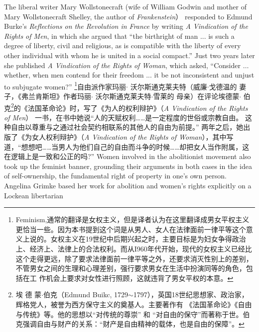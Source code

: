 \begin{paracol}{2}
The liberal writer Mary Wollstonecraft (wife of William Godwin and mother of Mary Wollstonecraft Shelley, the author of \textit{Frankenstein}） responded to Edmund Burke's \textit{Reflections on the
Revolution in France} by writing \textit{A Vindication of the Rights of Men},
in which she argued that ``the birthright of man ... is such a
degree of liberty, civil and religious, as is compatible with the
liberty of every other individual with whom he is united in a social compact.'' Just two years later she published \textit{A Vindication of the Rights of Woman}, which asked, ``Consider $\ldots$ whether, when
men contend for their freedom ... it be not inconsistent and unjust to subjugate women?''
\switchcolumn
\footnote{Feminism,通常的翻译是女权主义，但是译者认为在这里翻译成男女平权主义更恰当一些。因为本书提到这个词是从男人、女人在法律面前一律平等这个意义上说的。女权主义在19世纪中后期兴起之时，主要目标是为妇女争得政治上、经济上、法律上的合法权利。而从I960年代开始，现代的女权主义已经比这个走得更远，除了要求法律面前一律平等之外，还要求消灭性别上的差别，不管男女之间的生理和心理差别，强行要求男女在生活中扮演同等的角色，包括在工	作机会上要求对女性进行照顾，这就违背了男女平权的本意。}自由派作家玛丽$\cdot$ 沃尔斯通克莱夫特（威廉$\cdot$戈德温的
妻子，《弗兰肯斯坦》作者玛丽$\cdot$ 沃尔斯通克莱夫特$\cdot$雪莱的
母亲）在评论埃德蒙$\cdot$ 伯克\footnote{埃 德 蒙$\cdot$伯克（Edmund Buikc, 1729$\sim$1797），英国18世纪思想家、政治家，辉格党人，被誉为西方保守主义的奠基人。主要著作有 《法国革命论》《自由与传统》等。他的思想以“对传统的尊崇” 和 “对自由的保守”而著称于世。伯克强调自由与财产的关系：“财产是自由精神的载体，也是自由的保障”。}的《法国革命论》时，写了《为人的权利辩护》（\textit{A Vindication of the Rights of Men}） 一书，在书中她说“人的天赋权利……是一定程度的世俗或宗教自由。
这种自由以尊重与之通过社会契约相联系的其他人的自由为前提。” 两年之后，她出版了《为女人权利辩护》（\textit{A Vindication of the Rights of Woman}），其中写道，“想想吧……当男人为他们自己的自由而斗争的时候……却把女人当作附属，这在逻辑上是一致和公正的吗?”
\switchcolumn*
Women involved in the abolitionist movement also took up
the feminist banner, grounding their arguments in both cases in 
the idea of self-ownership, the fundamental right of property in
one's own person. Angelina Grimke based her work for abolition and women's rights explicitly on a Lockean libertarian

\end{paracol}
